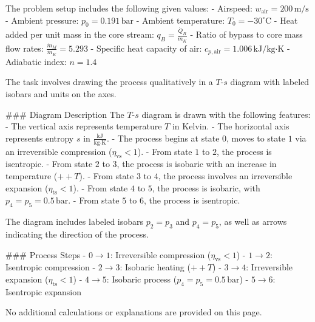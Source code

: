 The problem setup includes the following given values:  
- Airspeed: \( w_{\text{air}} = 200 \, \text{m/s} \)  
- Ambient pressure: \( p_0 = 0.191 \, \text{bar} \)  
- Ambient temperature: \( T_0 = -30^\circ\text{C} \)  
- Heat added per unit mass in the core stream: \( q_B = \frac{\dot{Q}_B}{\dot{m}_K} \)  
- Ratio of bypass to core mass flow rates: \( \frac{\dot{m}_M}{\dot{m}_K} = 5.293 \)  
- Specific heat capacity of air: \( c_{p,\text{air}} = 1.006 \, \text{kJ/kg·K} \)  
- Adiabatic index: \( n = 1.4 \)  

The task involves drawing the process qualitatively in a \( T \)-\( s \) diagram with labeled isobars and units on the axes.  

### Diagram Description  
The \( T \)-\( s \) diagram is drawn with the following features:  
- The vertical axis represents temperature \( T \) in Kelvin.  
- The horizontal axis represents entropy \( s \) in \( \frac{\text{kJ}}{\text{kg·K}} \).  
- The process begins at state \( 0 \), moves to state \( 1 \) via an irreversible compression (\( \eta_{\text{vs}} < 1 \)).  
- From state \( 1 \) to \( 2 \), the process is isentropic.  
- From state \( 2 \) to \( 3 \), the process is isobaric with an increase in temperature (\( ++T \)).  
- From state \( 3 \) to \( 4 \), the process involves an irreversible expansion (\( \eta_{\text{ts}} < 1 \)).  
- From state \( 4 \) to \( 5 \), the process is isobaric, with \( p_4 = p_5 = 0.5 \, \text{bar} \).  
- From state \( 5 \) to \( 6 \), the process is isentropic.  

The diagram includes labeled isobars \( p_2 = p_3 \) and \( p_4 = p_5 \), as well as arrows indicating the direction of the process.  

### Process Steps  
- \( 0 \to 1 \): Irreversible compression (\( \eta_{\text{vs}} < 1 \))  
- \( 1 \to 2 \): Isentropic compression  
- \( 2 \to 3 \): Isobaric heating (\( ++T \))  
- \( 3 \to 4 \): Irreversible expansion (\( \eta_{\text{ts}} < 1 \))  
- \( 4 \to 5 \): Isobaric process (\( p_4 = p_5 = 0.5 \, \text{bar} \))  
- \( 5 \to 6 \): Isentropic expansion  

No additional calculations or explanations are provided on this page.
